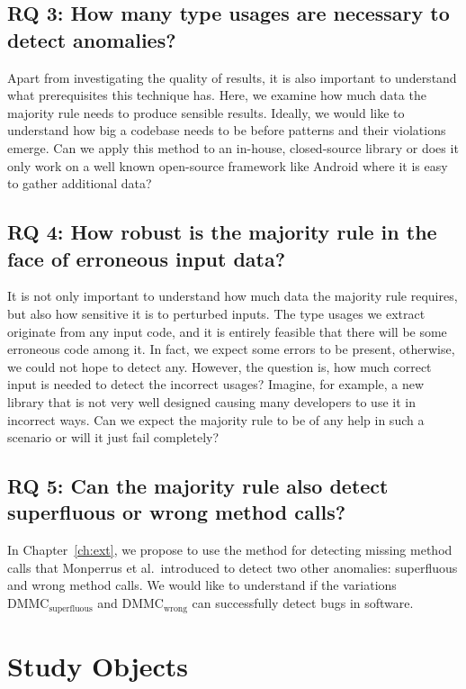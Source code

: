 \subsection*{RQ 3: How many type usages are necessary to detect anomalies?}

Apart from investigating the quality of results, it is also important to understand what prerequisites this technique has.
Here, we examine how much data the majority rule needs to produce sensible results.
Ideally, we would like to understand how big a codebase needs to be before patterns and their violations emerge.
Can we apply this method to an in-house, closed-source library or does it only work on a well known open-source framework like Android where it is easy to gather additional data?

\subsection*{RQ 4: How robust is the majority rule in the face of erroneous input data?}

It is not only important to understand how much data the majority rule requires, but also how sensitive it is to perturbed inputs.
The type usages we extract originate from any input code, and it is entirely feasible that there will be some erroneous code among it.
In fact, we expect some errors to be present, otherwise, we could not hope to detect any.
However, the question is, how much correct input is needed to detect the incorrect usages?
Imagine, for example, a new library that is not very well designed causing many developers to use it in incorrect ways.
Can we expect the majority rule to be of any help in such a scenario or will it just fail completely?

\subsection*{RQ 5: Can the majority rule also detect superfluous or wrong method calls?}

In Chapter~\ref{ch:ext}, we propose to use the method for detecting missing method calls that Monperrus et al.\ introduced to detect two other anomalies: superfluous and wrong method calls.
We would like to understand if the variations $\text{DMMC}_\text{superfluous}$ and $\text{DMMC}_\text{wrong}$ can successfully detect bugs in software.

\section{Study Objects} 

